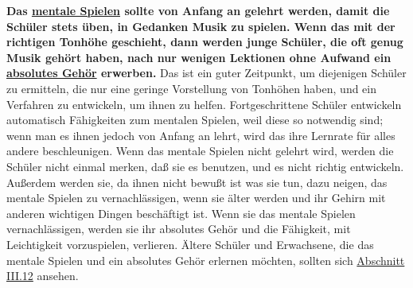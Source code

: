 \textbf{Das \hyperlink{c1ii12mental}{mentale Spielen} sollte von Anfang an gelehrt werden, damit die Schüler stets üben, in Gedanken Musik zu spielen.
Wenn das mit der richtigen Tonhöhe geschieht, dann werden junge Schüler, die oft genug Musik gehört haben, nach nur wenigen Lektionen ohne Aufwand ein \hyperlink{c1iii12}{absolutes Gehör} erwerben.}
Das ist ein guter Zeitpunkt, um diejenigen Schüler zu ermitteln, die nur eine geringe Vorstellung von Tonhöhen haben, und ein Verfahren zu entwickeln, um ihnen zu helfen.
Fortgeschrittene Schüler entwickeln automatisch Fähigkeiten zum mentalen Spielen, weil diese so notwendig sind; wenn man es ihnen jedoch von Anfang an lehrt, wird das ihre Lernrate für alles andere beschleunigen.
Wenn das mentale Spielen nicht gelehrt wird, werden die Schüler nicht einmal merken, daß sie es benutzen, und es nicht richtig entwickeln.
Außerdem werden sie, da ihnen nicht bewußt ist was sie tun, dazu neigen, das mentale Spielen zu vernachlässigen, wenn sie älter werden und ihr Gehirn mit anderen wichtigen Dingen beschäftigt ist.
Wenn sie das mentale Spielen vernachlässigen, werden sie ihr absolutes Gehör und die Fähigkeit, mit Leichtigkeit vorzuspielen, verlieren.
Ältere Schüler und Erwachsene, die das mentale Spielen und ein absolutes Gehör erlernen möchten, sollten sich \hyperlink{c1iii12}{Abschnitt III.12} ansehen.



